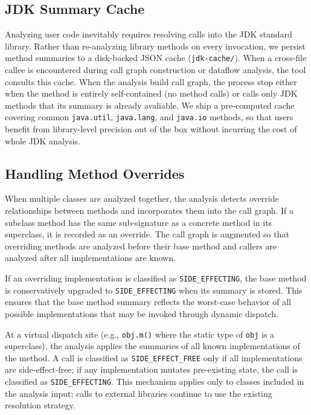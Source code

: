 \documentclass{article}
\begin{document}
\subsection{JDK Summary Cache}                                                   Analyzing user code inevitably requires resolving calls into the JDK standard library. Rather than re-analyzing library methods on every invocation, we persist method summaries to a disk-backed JSON  cache (\texttt{jdk-cache/}). When a cross-file callee is encountered during call graph construction or dataflow analysis, the tool consults this cache. When the analysis build call graph, the process stop either when the method is entirely self-contained (no method calls) or calls only JDK methods that its summary is already avaliable.  We ship a pre-computed cache covering common \texttt{java.util}, \texttt{java.lang}, and \texttt{java.io} methods, so that users benefit from library-level precision out of the box without incurring the cost of whole JDK analysis.  

\subsection{Handling Method Overrides}
\label{sec:override-analysis}

When multiple classes are analyzed together, the analysis detects override relationships between methods and incorporates them into the call graph. If a subclass method has the same sub-signature as a concrete method in its superclass, it is recorded as an override. The call graph is augmented so that overriding methods are analyzed before their base method and callers are analyzed after all implementations are known. 

If an overriding implementation is classified as \texttt{SIDE\_EFFECTING}, the base method is conservatively upgraded to \texttt{SIDE\_EFFECTING} when its summary is stored. This ensures that the base method summary reflects the worst-case behavior of all possible implementations that may be invoked through dynamic dispatch.

At a virtual dispatch site (e.g., \texttt{obj.m()} where the static type of \texttt{obj} is a superclass), the analysis applies the summaries of all known implementations of the method. A call is classified as \texttt{SIDE\_EFFECT\_FREE} only if all implementations are side-effect-free; if any implementation mutates pre-existing state, the call is classified as \texttt{SIDE\_EFFECTING}. This mechanism applies only to classes included in the analysis input; calls to external libraries continue to use the existing resolution strategy. 
\end{document}

